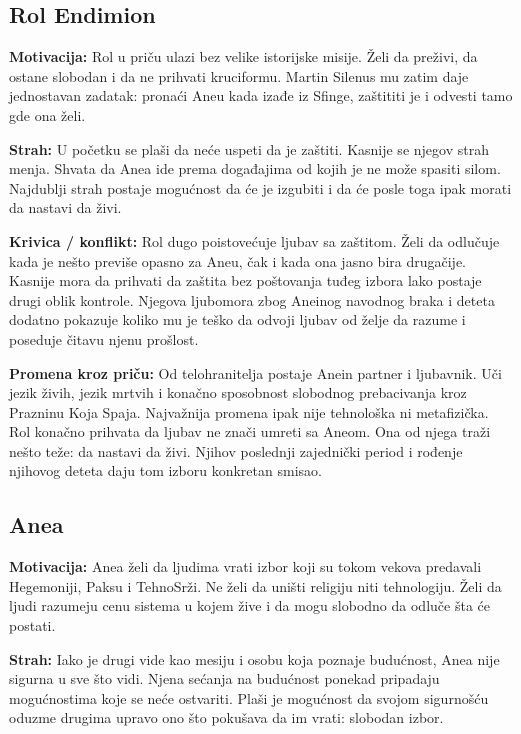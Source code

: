 \subsection*{Rol Endimion}

\textbf{Motivacija:} Rol u priču ulazi bez velike istorijske misije. Želi da preživi, da ostane slobodan i da ne prihvati kruciformu. Martin Silenus mu zatim daje jednostavan zadatak: pronaći Aneu kada izađe iz Sfinge, zaštititi je i odvesti tamo gde ona želi.

\textbf{Strah:} U početku se plaši da neće uspeti da je zaštiti. Kasnije se njegov strah menja. Shvata da Anea ide prema događajima od kojih je ne može spasiti silom. Najdublji strah postaje mogućnost da će je izgubiti i da će posle toga ipak morati da nastavi da živi.

\textbf{Krivica / konflikt:} Rol dugo poistovećuje ljubav sa zaštitom. Želi da odlučuje kada je nešto previše opasno za Aneu, čak i kada ona jasno bira drugačije. Kasnije mora da prihvati da zaštita bez poštovanja tuđeg izbora lako postaje drugi oblik kontrole. Njegova ljubomora zbog Aneinog navodnog braka i deteta dodatno pokazuje koliko mu je teško da odvoji ljubav od želje da razume i poseduje čitavu njenu prošlost.

\textbf{Promena kroz priču:} Od telohranitelja postaje Anein partner i ljubavnik. Uči jezik živih, jezik mrtvih i konačno sposobnost slobodnog prebacivanja kroz Prazninu Koja Spaja. Najvažnija promena ipak nije tehnološka ni metafizička. Rol konačno prihvata da ljubav ne znači umreti sa Aneom. Ona od njega traži nešto teže: da nastavi da živi. Njihov poslednji zajednički period i rođenje njihovog deteta daju tom izboru konkretan smisao.


\subsection*{Anea}

\textbf{Motivacija:} Anea želi da ljudima vrati izbor koji su tokom vekova predavali Hegemoniji, Paksu i TehnoSrži. Ne želi da uništi religiju niti tehnologiju. Želi da ljudi razumeju cenu sistema u kojem žive i da mogu slobodno da odluče šta će postati.

\textbf{Strah:} Iako je drugi vide kao mesiju i osobu koja poznaje budućnost, Anea nije sigurna u sve što vidi. Njena sećanja na budućnost ponekad pripadaju mogućnostima koje se neće ostvariti. Plaši je mogućnost da svojom sigurnošću oduzme drugima upravo ono što pokušava da im vrati: slobodan izbor.

